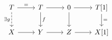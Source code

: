 \documentclass[12pt]{standalone}
\begin{document}
        $$

\begin{tikzcd}
T \arrow[d,"\exists g", swap, dashed] \arrow[r,"="] & T \arrow[r] \arrow[d,"f"] & 0 \arrow[r] \arrow[d] & T[1] \arrow[d,"="] \\
X \arrow[r] & Y \arrow[r] & Z \arrow[r] & X[1] 
\end{tikzcd}
        $$
        
\end{document}
